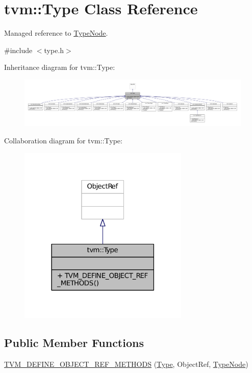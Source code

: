 \hypertarget{classtvm_1_1Type}{}\section{tvm\+:\+:Type Class Reference}
\label{classtvm_1_1Type}


Managed reference to \hyperlink{classtvm_1_1TypeNode}{Type\+Node}.  




{\ttfamily \#include $<$type.\+h$>$}



Inheritance diagram for tvm\+:\+:Type\+:
\nopagebreak
\begin{figure}[H]
\begin{center}
\leavevmode
\includegraphics[width=350pt]{classtvm_1_1Type__inherit__graph}
\end{center}
\end{figure}


Collaboration diagram for tvm\+:\+:Type\+:
\nopagebreak
\begin{figure}[H]
\begin{center}
\leavevmode
\includegraphics[width=230pt]{classtvm_1_1Type__coll__graph}
\end{center}
\end{figure}
\subsection*{Public Member Functions}
\begin{DoxyCompactItemize}
\item 
\hyperlink{classtvm_1_1Type_a1188605b5afd297c39e614872a608a35}{T\+V\+M\+\_\+\+D\+E\+F\+I\+N\+E\+\_\+\+O\+B\+J\+E\+C\+T\+\_\+\+R\+E\+F\+\_\+\+M\+E\+T\+H\+O\+DS} (\hyperlink{classtvm_1_1Type}{Type}, Object\+Ref, \hyperlink{classtvm_1_1TypeNode}{Type\+Node})
\end{DoxyCompactItemize}


